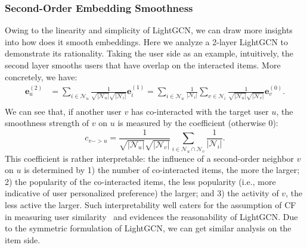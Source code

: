 \documentclass[sigconf]{acmart}
\theoremstyle{definition}
\begin{document}
\subsubsection{Second-Order Embedding Smoothness} \label{ss:second-order}
Owing to the linearity and simplicity of LightGCN, we can draw more insights into how does it smooth embeddings. Here we analyze a 2-layer LightGCN to demonstrate its rationality. Taking the user side as an example, intuitively, the second layer smooths users that have overlap on the interacted items. More concretely, we have:
\begin{equation}
\begin{aligned}
    \textbf{e}_{u}^{(2)} &= \sum_{i \in \mathcal{N}_u} \frac{1}{\sqrt{|\mathcal{N}_u|}\sqrt{|\mathcal{N}_i|}} \textbf{e}_i^{(1)} = \sum_{i \in \mathcal{N}_u} \frac{1}{|\mathcal{N}_i|} \sum_{v\in \mathcal{N}_i} \frac{1}{\sqrt{|\mathcal{N}_u|}\sqrt{|\mathcal{N}_v|} } \textbf{e}_{v}^{(0)}. \\ 
\end{aligned}
\end{equation}
We can see that, if another user $v$ has co-interacted with the target user $u$, the smoothness strength of $v$ on $u$ is measured by the coefficient (otherwise 0):
\begin{equation}\label{eq:c_vu}
    c_{v -> u} = \frac{1}{\sqrt{|\mathcal{N}_u|}\sqrt{|\mathcal{N}_v|}} \sum_{i \in \mathcal{N}_u \cap \mathcal{N}_v} \frac{1}{|\mathcal{N}_i|}. 
\end{equation}
This coefficient is rather interpretable: the influence of a second-order neighbor $v$ on $u$ is determined by 1) the number of co-interacted items, the more the larger; 2) the popularity of the co-interacted items, the less popularity (i.e., more indicative of user personalized preference) the larger; and 3) the activity of $v$, the less active the larger. 
Such interpretability well caters for the assumption of CF in measuring user similarity~\cite{CSE,Wang:2006} and evidences the reasonability of LightGCN. 
Due to the symmetric formulation of LightGCN, we can get similar analysis on the item side. 
\end{document}

